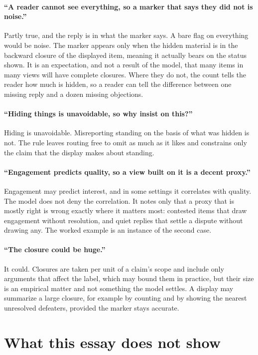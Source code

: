 \documentclass[11pt]{article}
\begin{document}
\paragraph{``A reader cannot see everything, so a marker that says they did not is noise.''} Partly true, and the reply is in what the marker says. A bare flag on everything would be noise. The marker appears only when the hidden material is in the backward closure of the displayed item, meaning it actually bears on the status shown. It is an expectation, and not a result of the model, that many items in
many views will have complete closures. Where they do not, the count tells the reader how much is hidden, so a reader can tell the difference between one missing reply and a dozen missing objections.

\paragraph{``Hiding things is unavoidable, so why insist on this?''} Hiding is unavoidable. Misreporting standing on the basis of what was hidden is not. The rule leaves routing free to omit as much as it likes and constrains only the claim that the display makes about standing.

\paragraph{``Engagement predicts quality, so a view built on it is a decent proxy.''} Engagement may predict interest, and in some settings it correlates with quality. The model does not deny the correlation. It notes only that a proxy that is mostly right is wrong exactly where it matters most: contested items that draw engagement without resolution, and quiet replies that settle a dispute without drawing any. The worked example is an instance of the second case.

\paragraph{``The closure could be huge.''} It could. Closures are taken per unit of a claim's scope and include only arguments that affect the label, which may bound them in practice, but their size is an empirical matter and not something the model settles. A display may summarize a large closure, for example by counting and by showing the nearest unresolved defeaters, provided the marker stays accurate.

\section{What this essay does not show}\label{sec:limits}
\end{document}
